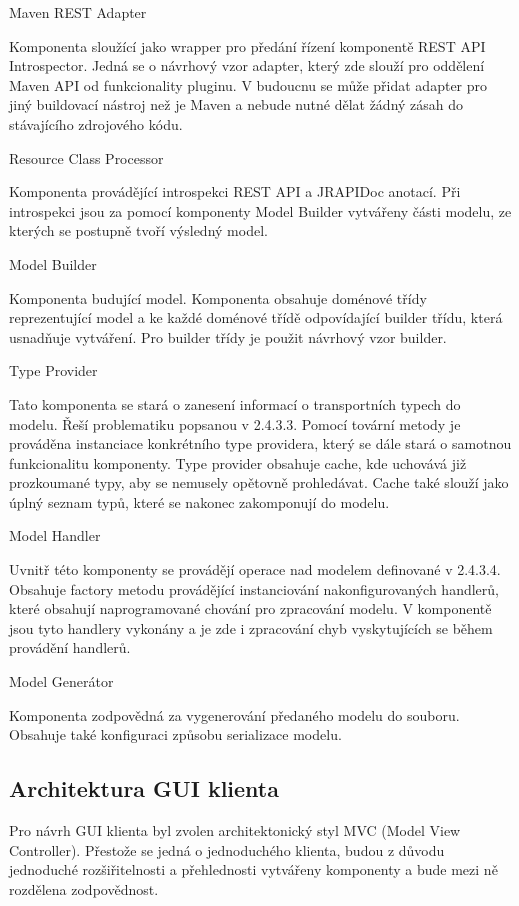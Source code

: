 \documentclass[11pt,twoside,a4paper]{book}
\begin{document}
\begin{itemize}
Maven REST Adapter

Komponenta sloužící jako wrapper pro předání řízení komponentě REST API Introspector.
Jedná se o návrhový vzor adapter, který zde slouží pro oddělení Maven API od funkcionality
pluginu. V budoucnu se může přidat adapter pro jiný buildovací nástroj než je Maven a
nebude nutné dělat žádný zásah do stávajícího zdrojového kódu.

Resource Class Processor

Komponenta provádějící introspekci REST API a JRAPIDoc anotací. Při introspekci jsou za
pomocí komponenty Model Builder vytvářeny části modelu, ze kterých se postupně tvoří
výsledný model.

Model Builder

Komponenta budující model. Komponenta obsahuje doménové třídy reprezentující model a
ke každé doménové třídě odpovídající builder třídu, která usnadňuje vytváření. Pro builder
třídy je použit návrhový vzor builder.

Type Provider

Tato komponenta se stará o zanesení informací o transportních typech do modelu. Řeší
problematiku popsanou v 2.4.3.3. Pomocí tovární metody je prováděna instanciace
konkrétního type providera, který se dále stará o samotnou funkcionalitu komponenty. Type
provider obsahuje cache, kde uchovává již prozkoumané typy, aby se nemusely opětovně
prohledávat. Cache také slouží jako úplný seznam typů, které se nakonec zakomponují do
modelu.

Model Handler

Uvnitř této komponenty se provádějí operace nad modelem definované v 2.4.3.4. Obsahuje
factory metodu provádějící instanciování nakonfigurovaných handlerů, které obsahují
naprogramované chování pro zpracování modelu. V komponentě jsou tyto handlery vykonány
a je zde i zpracování chyb vyskytujících se během provádění handlerů.

Model Generátor

Komponenta zodpovědná za vygenerování předaného modelu do souboru. Obsahuje také
konfiguraci způsobu serializace modelu.

\subsection{Architektura GUI klienta}

Pro návrh GUI klienta byl zvolen architektonický styl MVC (Model View Controller).
Přestože se jedná o jednoduchého klienta, budou z důvodu jednoduché rozšiřitelnosti a
přehlednosti vytvářeny komponenty a bude mezi ně rozdělena zodpovědnost.


\end{itemize}
\end{document}
